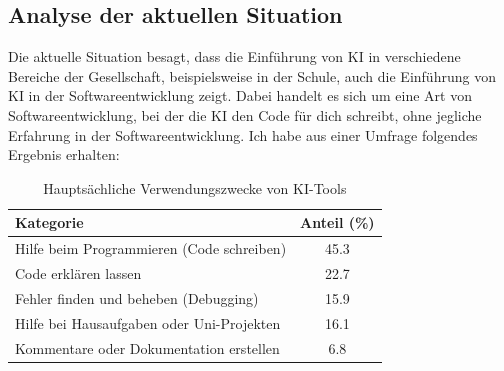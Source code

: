 \documentclass[paper=a4,fontsize=12pt,ngerman]{scrartcl}
\begin{document}
\subsection{Analyse der aktuellen Situation}
Die aktuelle Situation besagt, dass die Einführung von KI in verschiedene Bereiche der Gesellschaft, 
beispielsweise in der Schule, auch die Einführung von KI in der Softwareentwicklung zeigt. 
Dabei handelt es sich um eine Art von Softwareentwicklung, bei der die KI den Code für dich schreibt,
ohne jegliche Erfahrung in der Softwareentwicklung. Ich habe aus einer Umfrage folgendes Ergebnis erhalten: 

\begin{table}[ht]
    \centering
    \caption{Hauptsächliche Verwendungszwecke von KI-Tools}
    \begin{tabular}{l S[table-format=2.1]}
    \toprule
    \textbf{Kategorie} & \textbf{Anteil (\%)} \\
    \midrule
    Hilfe beim Programmieren (Code schreiben) & 45.3 \\
    Code erklären lassen & 22.7 \\
    Fehler finden und beheben (Debugging) & 15.9 \\
    Hilfe bei Hausaufgaben oder Uni-Projekten & 16.1 \\
    Kommentare oder Dokumentation erstellen & 6.8 \\
    \bottomrule
    \end{tabular}
\end{table}
\end{document}
